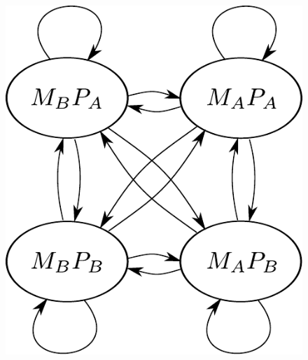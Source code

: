 \begin{figure}[t]
{\begin{minipage}[b]{0.45\textwidth}
		\includegraphics[height=0.2\textheight]{figures/NOR-HMM}
		\vspace{8pt}
	\end{minipage}	
}


\end{figure}
